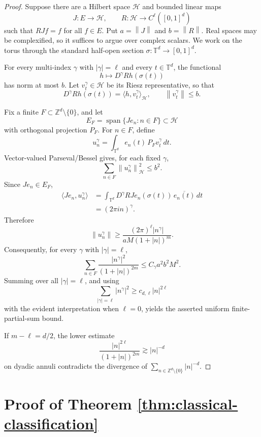 \documentclass[11pt]{article}
\newcommand{\norm}[1]{\left\lVert #1\right\rVert}
\newcommand{\abs}[1]{\left\lvert #1\right\rvert}
\begin{document}
\begin{proof}
Suppose there are a Hilbert space \(\mathcal H\) and bounded linear maps
\[
  J:E\to\mathcal H,\qquad R:\mathcal H\to C^\ell([0,1]^d)
\]
such that \(RJf=f\) for all \(f\in E\). Put \(a=\norm J\) and
\(b=\norm R\). Real spaces may be complexified, so it suffices to argue over
complex scalars. We work on the torus through the standard half-open section
\(\sigma:\mathbb T^d\to[0,1]^d\).

For every multi-index \(\gamma\) with \(|\gamma|=\ell\) and every
\(t\in\mathbb T^d\), the functional
\[
  h\longmapsto D^\gamma Rh(\sigma(t))
\]
has norm at most \(b\). Let \(v_t^\gamma\in\mathcal H\) be its Riesz
representative, so that
\[
  D^\gamma Rh(\sigma(t))=\langle h,v_t^\gamma\rangle_{\mathcal H},
  \qquad \norm{v_t^\gamma}\le b .
\]

Fix a finite \(F\subset\mathbb Z^d\setminus\{0\}\), and let
\[
  E_F=\operatorname{span}\{Je_n:n\in F\}\subset\mathcal H
\]
with orthogonal projection \(P_F\). For \(n\in F\), define
\[
  u_n^\gamma=\int_{\mathbb T^d} e_n(t)\,P_Fv_t^\gamma\,dt .
\]
Vector-valued Parseval/Bessel gives, for each fixed \(\gamma\),
\[
  \sum_{n\in F}\norm{u_n^\gamma}_{\mathcal H}^2
  \le b^2 .
\]
Since \(Je_n\in E_F\),
\[
\begin{aligned}
  \langle Je_n,u_n^\gamma\rangle
  &=
  \int_{\mathbb T^d}
  D^\gamma RJe_n(\sigma(t))\,\overline{e_n(t)}\,dt  \\
  &=
  (2\pi i n)^\gamma .
\end{aligned}
\]
Therefore
\[
  \norm{u_n^\gamma}
  \ge
  \frac{(2\pi)^\ell\abs{n^\gamma}}
       {aM(1+\abs n)^m}.
\]
Consequently, for every \(\gamma\) with \(|\gamma|=\ell\),
\[
  \sum_{n\in F}
  \frac{\abs{n^\gamma}^2}{(1+\abs n)^{2m}}
  \le C_{\gamma}a^2b^2M^2 .
\]
Summing over all \(|\gamma|=\ell\), and using
\[
  \sum_{|\gamma|=\ell}\abs{n^\gamma}^2
  \ge c_{d,\ell}\abs n^{2\ell}
\]
with the evident interpretation when \(\ell=0\), yields the asserted
uniform finite-partial-sum bound.

If \(m-\ell=d/2\), the lower estimate
\[
  \frac{\abs{n}^{2\ell}}{(1+\abs{n})^{2m}}
  \gtrsim \abs{n}^{-d}
\]
on dyadic annuli contradicts the divergence of
\(\sum_{n\in\mathbb Z^d\setminus\{0\}}\abs{n}^{-d}\).
\end{proof}

\section*{Proof of Theorem \ref{thm:classical-classification}}
\end{document}
